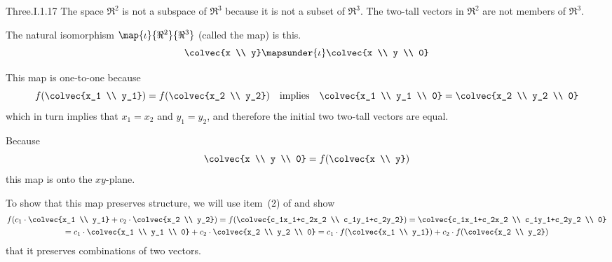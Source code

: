 \begin{ans}{Three.I.1.17}
       The space $\Re^2$ is not a subspace of $\Re^3$ because it is not a
       subset of $\Re^3$.
       The two-tall vectors in $\Re^2$ are not members of $\Re^3$.

       The natural isomorphism \( \map{\iota}{\Re^2}{\Re^3} \)
       (called the  map) is this.
       \begin{equation*}
         \colvec{x \\ y}
           \mapsunder{\iota}
         \colvec{x \\ y \\ 0}
       \end{equation*}

       This map is one-to-one because
       \begin{equation*}
         f(\colvec{x_1 \\ y_1})=f(\colvec{x_2 \\ y_2})
         \quad\text{implies}\quad
         \colvec{x_1 \\ y_1 \\ 0}=\colvec{x_2 \\ y_2 \\ 0}
       \end{equation*}
       which in turn implies that $x_1=x_2$ and $y_1=y_2$, and therefore
       the initial two two-tall vectors are equal.

       Because
       \begin{equation*}
         \colvec{x \\ y \\ 0}
         =f(\colvec{x \\ y})
       \end{equation*}
       this map is onto the $xy$-plane.

       To show that this map preserves structure, we will use
       item~(2) of  and show
       \begin{multline*}
         f(c_1\cdot \colvec{x_1 \\ y_1}+c_2\cdot \colvec{x_2 \\ y_2})
          = f(\colvec{c_1x_1+c_2x_2 \\ c_1y_1+c_2y_2})
          =\colvec{c_1x_1+c_2x_2 \\ c_1y_1+c_2y_2 \\ 0}                     \\
          =c_1\cdot \colvec{x_1 \\ y_1 \\ 0}+c_2\cdot \colvec{x_2 \\ y_2 \\ 0}
          =c_1\cdot f(\colvec{x_1 \\ y_1})+c_2\cdot f(\colvec{x_2 \\ y_2})
       \end{multline*}
       that it preserves combinations of two vectors.
     
\end{ans}
